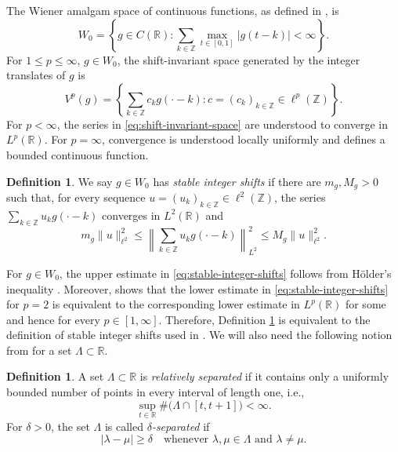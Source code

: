 \documentclass[11pt]{amsart}
\numberwithin{equation}{section}
\theoremstyle{definition}
\newtheorem{definition}[theorem]{Definition}
\theoremstyle{remark}
\newcommand{\R}{\mathbb R}
\newcommand{\Z}{\mathbb Z}
\begin{document}
The Wiener amalgam space of continuous functions, as defined in \cite[Chapter~6]{GroechenigBook}, is
\begin{equation}
W_0=\left\{g\in C(\R):
    \sum_{k\in\Z}\max_{t\in[0,1]}|g(t-k)|<\infty\right\}.
\end{equation}
For $1\leq p\leq\infty$, $g\in W_0$, the shift-invariant space generated by the integer translates of $g$ is
\begin{equation}\label{eq:shift-invariant-space}
    V^p(g)
    =\left\{
        \sum_{k\in\Z}c_k g(\cdot-k) : c=(c_k)_{k\in\Z}\in\ell^p(\Z)
    \right\}.
\end{equation}
For $p<\infty$, the series in \eqref{eq:shift-invariant-space} are understood to converge in $L^p(\R)$. For $p=\infty$, convergence is understood locally uniformly and defines a bounded continuous function.
\begin{definition}\label{def:stableIntegerShifts}
    We say $g\in W_0$ has \emph{stable integer shifts} if there are $m_g,M_g>0$ such that, for every sequence $u=(u_k)_{k\in\Z}\in\ell^2(\Z)$, the series $\sum_{k\in\Z}u_kg(\cdot-k)$ converges in $L^2(\R)$ and
    \begin{equation}\label{eq:stable-integer-shifts}
        m_g\|u\|_{\ell^2}^2
        \leq
        \left\|\sum_{k\in\Z}u_kg(\cdot-k)\right\|_{L^2}^2
        \leq
        M_g\|u\|_{\ell^2}^2.
    \end{equation}
\end{definition}
For $g\in W_0$, the upper estimate in \eqref{eq:stable-integer-shifts} follows from H\"older's inequality \cite{AldroubiGroechenig}. Moreover, \cite[Theorem~2.1]{GRSsampling} shows that the lower estimate in \eqref{eq:stable-integer-shifts} for $p=2$ is equivalent to the corresponding lower estimate in $L^p(\R)$ for some and hence for every $p\in[1,\infty]$. Therefore, Definition \ref{def:stableIntegerShifts} is equivalent to the definition of stable integer shifts used in \cite{GRSsampling}. We will also need the following notion from \cite{GRSsampling} for a set $\Lambda \subset \R$.
\begin{definition}
    A set $\Lambda\subset\R$ is \emph{relatively separated} if it contains only a uniformly bounded number of points in every interval of length one, i.e.,
    \begin{equation}
        \sup_{t\in\R}\#\bigl(\Lambda\cap[t,t+1]\bigr)<\infty.
    \end{equation}
    For $\delta>0$, the set $\Lambda$ is called \emph{$\delta$-separated} if
    \begin{equation}
        |\lambda-\mu|\geq\delta
        \quad\text{whenever }\lambda,\mu\in\Lambda\text{ and }\lambda\neq\mu.
    \end{equation}
\end{definition}
\end{document}
